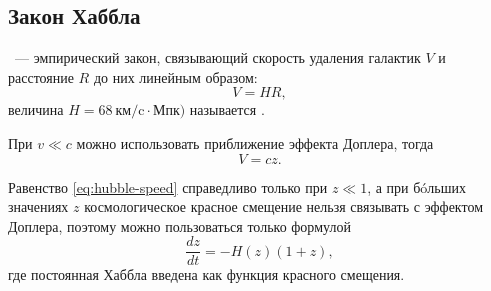 \subsection{Закон Хаббла}
~--- эмпирический закон, связывающий скорость удаления галактик $V$ и расстояние $R$ до них линейным образом: 
\begin{equation}
	V = H R,
\end{equation}
величина $H=68~\text{км/c} \cdot \text{Мпк})$ называется .

При $v \ll c$ можно использовать приближение эффекта Доплера, тогда
\begin{equation}
	V = c z.
\label{eq:hubble-speed}
\end{equation}

Равенство \eqref{eq:hubble-speed} справедливо только при $z \ll 1$, а при б\'{o}льших значениях $z$ космологическое красное смещение нельзя связывать с эффектом Доплера, поэтому можно пользоваться только формулой 
\begin{equation}
	\frac{dz}{dt} = - H(z)(1+z),
\end{equation}
где постоянная Хаббла введена как функция красного смещения.